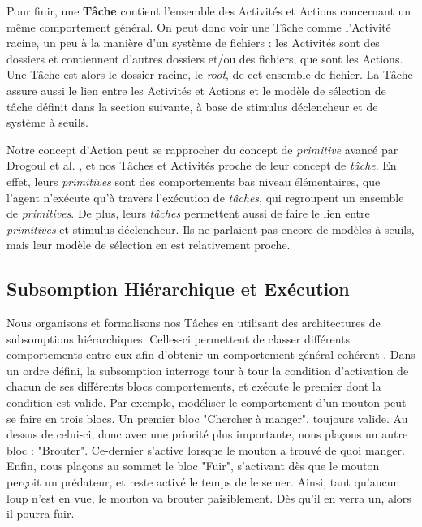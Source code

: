 			Pour finir, une \textbf{Tâche} contient l'ensemble des Activités et Actions concernant un même comportement général. On peut donc voir une Tâche comme l'Activité racine, un peu à la manière d'un système de fichiers : les Activités sont des dossiers et contiennent d'autres dossiers et/ou des fichiers, que sont les Actions. Une Tâche est alors le dossier racine, le \textit{root}, de cet ensemble de fichier. La Tâche assure aussi le lien entre les Activités et Actions et le modèle de sélection de tâche définit dans la section suivante, à base de stimulus déclencheur et de système à seuils.
			
			Notre concept d'Action peut se rapprocher du concept de \textit{primitive} avancé par Drogoul et al. \cite{drogoul_multi-agent_1992}, et nos Tâches et Activités proche de leur concept de \textit{tâche}. En effet, leurs \textit{primitives} sont des comportements bas niveau élémentaires, que l'agent n'exécute qu'à travers l'exécution de \textit{tâches}, qui regroupent un ensemble de \textit{primitives}. De plus, leurs \textit{tâches} permettent aussi de faire le lien entre \textit{primitives} et stimulus déclencheur. Ils ne parlaient pas encore de modèles à seuils, mais leur modèle de sélection en est relativement proche.
			
		\subsection{Subsomption Hiérarchique et Exécution}
		
			Nous organisons et formalisons nos Tâches en utilisant des architectures de subsomptions hiérarchiques. Celles-ci permettent de classer différents comportements entre eux afin d'obtenir un comportement général cohérent \cite{brooks_robust_1986}. Dans un ordre défini, la subsomption interroge tour à tour la condition d'activation de chacun de ses différents blocs comportements, et exécute le premier dont la condition est valide. Par exemple, modéliser le comportement d'un mouton peut se faire en trois blocs. Un premier bloc "Chercher à manger", toujours valide. Au dessus de celui-ci, donc avec une priorité plus importante, nous plaçons un autre bloc : "Brouter". Ce-dernier s'active lorsque le mouton a trouvé de quoi manger. Enfin, nous plaçons au sommet le bloc "Fuir", s'activant dès que le mouton perçoit un prédateur, et reste activé le temps de le semer. Ainsi, tant qu'aucun loup n'est en vue, le mouton va brouter paisiblement. Dès qu'il en verra un, alors il pourra fuir.
			
